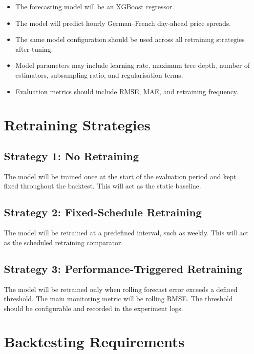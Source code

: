 \documentclass[12pt,a4paper]{article}
\begin{document}
\begin{itemize}
    \item The forecasting model will be an XGBoost regressor.
    \item The model will predict hourly German--French day-ahead price spreads.
    \item The same model configuration should be used across all retraining strategies after tuning.
    \item Model parameters may include learning rate, maximum tree depth, number of estimators, subsampling ratio, and regularisation terms.
    \item Evaluation metrics should include RMSE, MAE, and retraining frequency.
\end{itemize}

\section{Retraining Strategies}

\subsection{Strategy 1: No Retraining}

The model will be trained once at the start of the evaluation period and kept fixed throughout the backtest. This will act as the static baseline.

\subsection{Strategy 2: Fixed-Schedule Retraining}

The model will be retrained at a predefined interval, such as weekly. This will act as the scheduled retraining comparator.

\subsection{Strategy 3: Performance-Triggered Retraining}

The model will be retrained only when rolling forecast error exceeds a defined threshold. The main monitoring metric will be rolling RMSE. The threshold should be configurable and recorded in the experiment logs.

\section{Backtesting Requirements}
\end{document}
